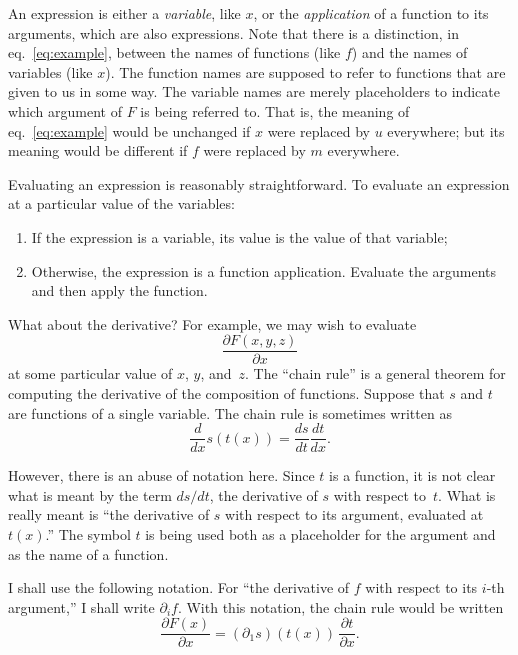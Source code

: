\documentclass[11pt, a4paper]{article}
\begin{document}
An expression is either a \emph{variable}, like $x$, or the
\emph{application} of a function to its arguments, which are also
expressions. Note that there is a distinction, in
eq.~\eqref{eq:example}, between the names of functions (like $f$) and
the names of variables (like $x$). The function names are supposed to
refer to functions that are given to us in some way. The variable
names are merely placeholders to indicate which argument of $F$ is
being referred to. That is, the meaning of eq.~\eqref{eq:example}
would be unchanged if $x$ were replaced by $u$ everywhere; but its
meaning would be different if $f$ were replaced by $m$ everywhere.

Evaluating an expression is reasonably straightforward. To evaluate
an expression at a particular value of the variables:
\begin{enumerate}
\item If the expression is a variable, its value is the value of that
  variable;
\item Otherwise, the expression is a function application. Evaluate
  the arguments and then apply the function. 
\end{enumerate}

What about the derivative? For example, we may wish to evaluate
\begin{equation}
  \label{eq:partial-example}
  \frac{\partial F(x,y,z)}{\partial x}
\end{equation}
at some particular value of $x$, $y$, and~$z$. The ``chain rule'' is a
general theorem for computing the derivative of the composition of
functions. Suppose that $s$ and $t$ are functions of a single
variable. The chain rule is sometimes written as
\begin{equation*}
  \label{eq:chain-rule}
  \frac{d}{dx} s(t(x)) = \frac{d s}{dt} \frac{dt}{dx}. 
\end{equation*}

However, there is an abuse of notation here. Since $t$ is a function,
it is not clear what is meant by the term $ds/dt$, the derivative of
$s$ with respect to~$t$. What is really meant is ``the derivative of
$s$ with respect to its argument, evaluated at $t(x)$.''  The symbol
$t$ is being used both as a placeholder for the argument and as the
name of a function.

I shall use the following notation. For ``the derivative of $f$ with
respect to its $i$-th argument,'' I shall write $\partial_i f$. With this
notation, the chain rule would be written
\begin{equation}
  \label{eq:chain-rule}
  \frac{\partial F(x)}{\partial x} = (\partial_1s)(t(x)) \, \frac{\partial t}{\partial x}.
\end{equation}
\end{document}

